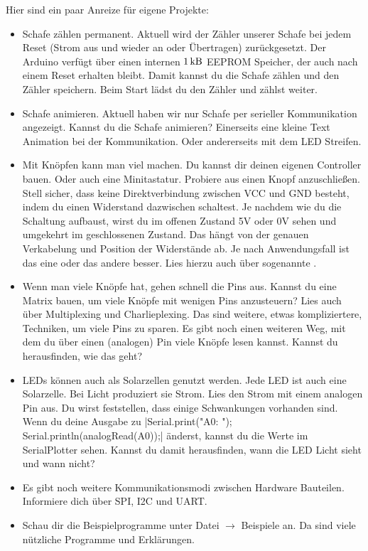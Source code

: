 \documentclass[a4paper,12pt]{book}
\begin{document}
Hier sind ein paar Anreize für eigene Projekte:
\begin{itemize}[label=\textsquare]
  \item Schafe zählen permanent.
  Aktuell wird der Zähler unserer Schafe bei jedem Reset (Strom aus und wieder an oder Übertragen) zurückgesetzt.
  Der Arduino verfügt über einen internen $\SI{1}{\kilo\byte}$ EEPROM Speicher, der auch nach einem Reset erhalten bleibt.
  Damit kannst du die Schafe zählen und den Zähler speichern.
  Beim Start lädst du den Zähler und zählst weiter.
  \item Schafe animieren.
  Aktuell haben wir nur Schafe per serieller Kommunikation angezeigt.
  Kannst du die Schafe animieren?
  Einerseits eine kleine Text Animation bei der Kommunikation.
  Oder andererseits mit dem LED Streifen.
  \item Mit Knöpfen kann man viel machen.
  Du kannst dir deinen eigenen Controller bauen.
  Oder auch eine Minitastatur.
  Probiere aus einen Knopf anzuschließen. Stell sicher, dass keine Direktverbindung zwischen VCC und GND besteht,
  indem du einen Widerstand dazwischen schaltest.
  Je nachdem wie du die Schaltung aufbaust, wirst du im offenen Zustand 5V oder 0V sehen und umgekehrt im geschlossenen Zustand.
  Das hängt von der genauen Verkabelung und Position der Widerstände ab.
  Je nach Anwendungsfall ist das eine oder das andere besser.
  Lies hierzu auch über sogenannte .
  \item Wenn man viele Knöpfe hat, gehen schnell die Pins aus.
  Kannst du eine Matrix bauen, um viele Knöpfe mit wenigen Pins anzusteuern?
  Lies auch über Multiplexing und Charlieplexing. Das sind weitere, etwas kompliziertere, 
  Techniken, um viele Pins zu sparen.
  Es gibt noch einen weiteren Weg, mit dem du über einen (analogen) Pin viele Knöpfe lesen kannst.
  Kannst du herausfinden, wie das geht?
  \item LEDs können auch als Solarzellen genutzt werden.
  Jede LED ist auch eine Solarzelle. Bei Licht produziert sie Strom.
  Lies den Strom mit einem analogen Pin aus.
  Du wirst feststellen, dass einige Schwankungen vorhanden sind.
  Wenn du deine Ausgabe zu |Serial.print("A0: "); Serial.println(analogRead(A0));| änderst, kannst du die Werte im SerialPlotter sehen.
  Kannst du damit herausfinden, wann die LED Licht sieht und wann nicht?
  \item Es gibt noch weitere Kommunikationsmodi zwischen Hardware Bauteilen.
  Informiere dich über SPI, I2C und UART.
  \item Schau dir die Beispielprogramme unter Datei $\rightarrow$ Beispiele an.
  Da sind viele nützliche Programme und Erklärungen.
\end{itemize}
\end{document}
